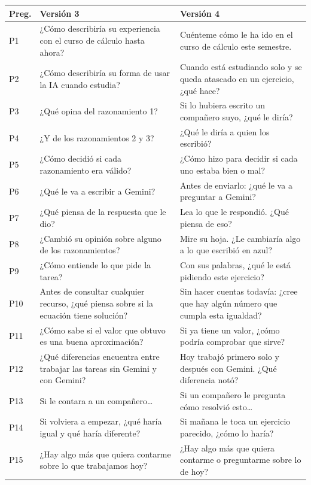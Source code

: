 \documentclass[11pt,letterpaper]{article}
\newcounter{preg}
\begin{document}
\begin{center}
\small
\renewcommand{\arraystretch}{1.3}
\begin{longtable}{@{}p{0.8cm}p{6.4cm}p{6.4cm}@{}}
\toprule
\textbf{Preg.} & \textbf{Versión 3} & \textbf{Versión 4}\\
\midrule
\endhead
P1 & ¿Cómo describiría su experiencia con el curso de cálculo hasta ahora? & Cuénteme cómo le ha ido en el curso de cálculo este semestre.\\
P2 & ¿Cómo describiría su forma de usar la IA cuando estudia? & Cuando está estudiando solo y se queda atascado en un ejercicio, ¿qué hace?\\
P3 & ¿Qué opina del razonamiento 1? & Si lo hubiera escrito un compañero suyo, ¿qué le diría?\\
P4 & ¿Y de los razonamientos 2 y 3? & ¿Qué le diría a quien los escribió?\\
P5 & ¿Cómo decidió si cada razonamiento era válido? & ¿Cómo hizo para decidir si cada uno estaba bien o mal?\\
P6 & ¿Qué le va a escribir a Gemini? & Antes de enviarlo: ¿qué le va a preguntar a Gemini?\\
P7 & ¿Qué piensa de la respuesta que le dio? & Lea lo que le respondió. ¿Qué piensa de eso?\\
P8 & ¿Cambió su opinión sobre alguno de los razonamientos? & Mire su hoja. ¿Le cambiaría algo a lo que escribió en azul?\\
P9 & ¿Cómo entiende lo que pide la tarea? & Con sus palabras, ¿qué le está pidiendo este ejercicio?\\
P10 & Antes de consultar cualquier recurso, ¿qué piensa sobre si la ecuación tiene solución? & Sin hacer cuentas todavía: ¿cree que hay algún número que cumpla esta igualdad?\\
P11 & ¿Cómo sabe si el valor que obtuvo es una buena aproximación? & Si ya tiene un valor, ¿cómo podría comprobar que sirve?\\
P12 & ¿Qué diferencias encuentra entre trabajar las tareas sin Gemini y con Gemini? & Hoy trabajó primero solo y después con Gemini. ¿Qué diferencia notó?\\
P13 & Si le contara a un compañero\ldots & Si un compañero le pregunta cómo resolvió esto\ldots\\
P14 & Si volviera a empezar, ¿qué haría igual y qué haría diferente? & Si mañana le toca un ejercicio parecido, ¿cómo lo haría?\\
P15 & ¿Hay algo más que quiera contarme sobre lo que trabajamos hoy? & ¿Hay algo más que quiera contarme o preguntarme sobre lo de hoy?\\
\bottomrule
\end{longtable}
\end{center}
\end{document}
